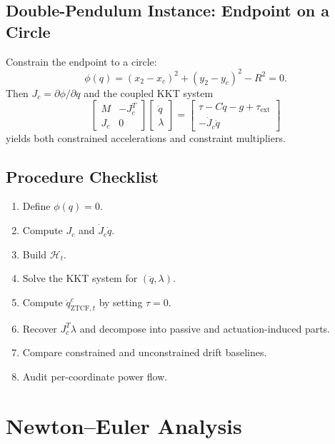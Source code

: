 \documentclass[11pt]{article}
\begin{document}
\subsection{Double-Pendulum Instance: Endpoint on a Circle}

Constrain the endpoint to a circle:
\begin{equation}
\phi(q) = (x_2-x_c)^2 + (y_2-y_c)^2 - R^2 = 0.
\end{equation}
Then $J_c = \partial\phi/\partial q$ and the coupled KKT system
\begin{equation}
\begin{bmatrix}M & -J_c^T \\ J_c & 0\end{bmatrix}
\begin{bmatrix}\ddot{q}\\\lambda\end{bmatrix} =
\begin{bmatrix}\tau-C\dot{q}-g+\tau_{\mathrm{ext}}\\-\dot{J}_c\dot{q}\end{bmatrix}
\end{equation}
yields both constrained accelerations and constraint multipliers.

\subsection{Procedure Checklist}

\begin{enumerate}
\item Define $\phi(q)=0$.
\item Compute $J_c$ and $\dot{J}_c\dot{q}$.
\item Build $\mathcal{H}_t$.
\item Solve the KKT system for $(\ddot{q},\lambda)$.
\item Compute $\ddot{q}_{\mathrm{ZTCF},t}^{c}$ by setting $\tau=0$.
\item Recover $J_c^T\lambda$ and decompose into passive and actuation-induced parts.
\item Compare constrained and unconstrained drift baselines.
\item Audit per-coordinate power flow.
\end{enumerate}


\section{Newton--Euler Analysis}\label{sec:newton-euler}
\end{document}

